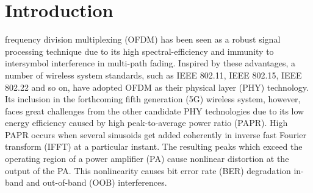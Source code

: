 \documentclass[journal,comsoc]{IEEEtran}
\begin{document}
\section{Introduction}
 frequency division multiplexing (OFDM) has been seen as a robust signal processing technique due to its high spectral-efficiency and immunity to intersymbol interference in multi-path fading.  Inspired by these advantages, a number of wireless system standards, such as IEEE 802.11, IEEE 802.15, IEEE 802.22 and so on, have adopted OFDM as their physical layer (PHY) technology. Its inclusion in the forthcoming fifth generation (5G) wireless system, however, faces great challenges from the other candidate PHY technologies due to its low energy efficiency caused by high peak-to-average power ratio (PAPR). High PAPR occurs when several sinusoids get added coherently in inverse fast Fourier transform (IFFT) at a particular instant. The resulting peaks which exceed the operating region of a power amplifier (PA) cause nonlinear distortion at the output of the PA. This nonlinearity causes bit error rate (BER) degradation in-band and out-of-band (OOB) interferences.
\end{document}
